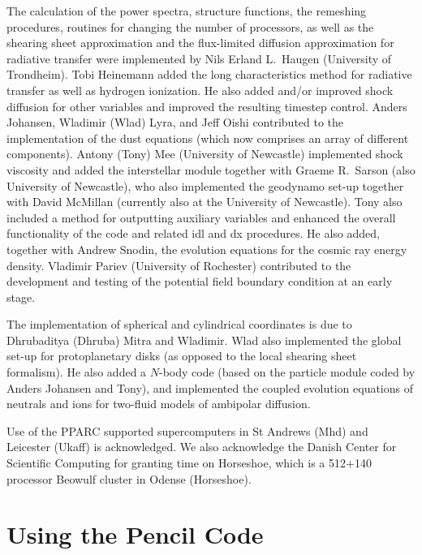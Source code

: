 \documentclass[\mydriver,12pt,twoside,notitlepage,a4paper]{article}
\begin{document}
The calculation of the power spectra, structure functions,
the remeshing procedures,
routines for changing the number of processors, as well as
the shearing sheet approximation and the flux-limited diffusion
approximation for radiative transfer
were implemented by Nils Erland L.\ Haugen (University of Trondheim).
Tobi Heinemann added the long characteristics method for
radiative transfer as well as hydrogen ionization.
He also added and/or improved shock diffusion for other variables
and improved the resulting timestep control.
Anders Johansen, Wladimir (Wlad) Lyra, and Jeff Oishi contributed
to the implementation of
the dust equations (which now comprises an array of different components).
Antony (Tony) Mee (University of Newcastle) implemented shock viscosity
and added the interstellar module together with
Graeme R.\ Sarson (also University of Newcastle), who also implemented
the geodynamo set-up together with David McMillan
(currently also at the University of Newcastle).
Tony also included a method for outputting auxiliary variables and
enhanced the overall functionality of the code and related idl and dx
procedures.
He also added, together with Andrew Snodin, the evolution equations
for the cosmic ray energy density.
Vladimir Pariev (University of Rochester) contributed to the development
and testing of the potential field boundary condition at an early stage.

The implementation of spherical and cylindrical coordinates is due
to Dhrubaditya (Dhruba) Mitra and Wladimir. Wlad also
implemented the global set-up for protoplanetary
disks (as opposed to the local shearing sheet formalism). He also added a
$N$-body code (based on the particle module coded by Anders Johansen
and Tony), and implemented the coupled evolution equations of neutrals and
ions for two-fluid models of ambipolar diffusion.

Use of the PPARC supported supercomputers in St Andrews (Mhd) and
Leicester (Ukaff) is acknowledged. We also acknowledge the Danish Center
for Scientific Computing for granting time on Horseshoe, which is a
512+140 processor Beowulf cluster in Odense (Horseshoe).

\clearpage
\tableofcontents
\cleardoublepage
\pagestyle{fancy}



\part{Using the {\sc Pencil Code}}
\end{document}
